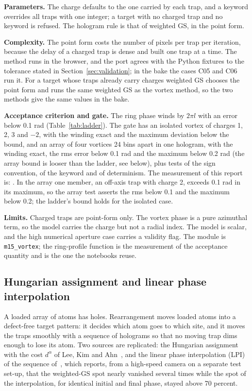 \textbf{Parameters.} The charge defaults to the one carried by each trap, and a keyword overrides all traps with one integer; a target with no charged trap and no keyword is refused. The hologram rule is that of weighted GS, in the point form.

\textbf{Complexity.} The point form costs the number of pixels per trap per iteration, because the delay of a charged trap is dense and built one trap at a time. The method runs in the browser, and the port agrees with the Python fixtures to the tolerance stated in Section~\ref{sec:validation}; in the bake the cases C05 and C06 run it. For a target whose traps already carry charges weighted GS chooses the point form and runs the same weighted GS as the vortex method, so the two methods give the same values in the bake.

\textbf{Acceptance criterion and gate.} The ring phase winds by $2\pi l$ with an error below 0.1 rad (Table~\ref{tab:ladder}). The gate has an isolated vortex of charges 1, 2, 3 and $-2$, with the winding exact and the maximum deviation below the bound, and an array of four vortices 24 bins apart in one hologram, with the winding exact, the rms error below 0.1 rad and the maximum below 0.2 rad (the array bound is looser than the ladder, see below), plus tests of the sign convention, of the keyword and of determinism. The measurement of this report is: . In the array one member, an off-axis trap with charge 2, exceeds 0.1 rad in its maximum, so the array test asserts the rms below 0.1 and the maximum below 0.2; the ladder's bound holds for the isolated case.

\textbf{Limits.} Charged traps are point-form only. The vortex phase is a pure azimuthal term, so the model carries the charge but not a radial index. The model is scalar, and the high numerical aperture case carries a validity flag. The module is \texttt{m15\_vortex}; the ring-profile function is the measurement of the acceptance quantity and is the one the notebooks reuse.

\subsection{Hungarian assignment and linear phase interpolation}\label{sec:m16}

A loaded array of atoms has holes. Rearrangement moves loaded atoms into a defect-free target pattern: it decides which atom goes to which site, and it moves the traps smoothly with a sequence of holograms so that no moving trap dims enough to lose its atom. Two sources are replicated: the Hungarian assignment with the cost $d^\alpha$ of Lee, Kim and Ahn~\cite{lee2017}, and the linear phase interpolation (LPI) of the sequence of~\cite{lpi}, which reports, from a high-speed camera on a separate test set-up, that the weighted-GS spot nearly vanished several times while the spot of the interpolation, for identical initial and final phase, stayed above 70 percent.

